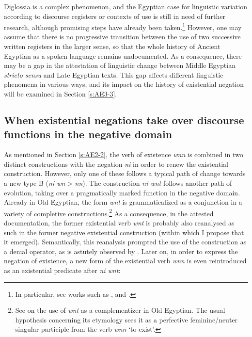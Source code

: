 \documentclass[output=paper]{langsci/langscibook}
\begin{document}
Diglossia is a complex phenomenon, and the Egyptian case for linguistic variation according to discourse registers or contexts of use is still in need of further research, although promising steps have already been taken.\footnote{In particular, see works such as \citet{Stauder2014a}, \citet{Werning2013} and \citet{Polis2017}.} 
However, one may assume that there is no progressive transition between the use of two successive written registers in the larger sense, so that the whole history of Ancient Egyptian as a spoken language remains undocumented. As a consequence, there may be a gap in the attestation of linguistic change between Middle Egyptian \emph{stricto sensu} and Late Egyptian texts. This gap affects different linguistic phenomena in various ways, and its impact on the history of existential negation will be examined in Section \ref{s:AE3-3}.  

\subsection{When existential negations take over discourse functions in the negative domain}\label{s:AE3-2}

As mentioned in Section \ref{s:AE2-2}, the verb of existence \textit{wnn} is combined in two distinct constructions with the negation \textit{ni} in order to renew the existential construction. However, only one of these follows a typical path of change towards a new type B (\textit{ni wn} > \textit{nn}). The construction \textit{ni wnt} follows another path of evolution, taking over a pragmatically marked function in the negative domain. Already in Old Egyptian, the form \textit{wnt} is grammaticalized as a conjunction in a variety of completive constructions.\footnote{See \citet{Uljas2007} on the use of \textit{wnt} as a complementizer in Old Egyptian. The usual hypothesis concerning its etymology sees it as a perfective feminine/neuter singular participle from the verb \textit{wnn} ‘to exist’.} 
As a consequence, in the attested documentation, the former existential verb \textit{wnt} is probably also reanalysed as such in the former negative existential construction (within which I propose that it emerged). Semantically, this reanalysis prompted the use of the construction as a denial operator, as is astutely observed by \citet[192–193]{Uljas2007}. Later on, in order to express the negation of existence, a new form of the existential verb \textit{wnn} is even reintroduced as an existential predicate after \textit{ni wnt}: 
 
\end{document}

